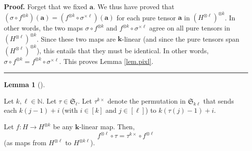 \documentclass[numbers=enddot,12pt,final,onecolumn,notitlepage]{scrartcl}%
\theoremstyle{definition}
\newtheorem{lem}[theo]{Lemma}
\newenvironment{lemma}[1][]
{\begin{lem}[#1]\begin{leftbar}}
{\end{leftbar}\end{lem}}
\newenvironment{proof}[1][Proof]{\noindent\textbf{#1.} }{\ \rule{0.5em}{0.5em}}
\begin{document}
\begin{proof}
Forget that we fixed $\mathbf{a}$. We thus have proved that $\left(
\sigma\circ f^{\otimes k}\right)  \left(  \mathbf{a}\right)  =\left(
f^{\otimes k}\circ\sigma^{\times\ell}\right)  \left(  \mathbf{a}\right)  $ for
each pure tensor $\mathbf{a}$ in $\left(  H^{\otimes\ell}\right)  ^{\otimes
k}$. In other words, the two maps $\sigma\circ f^{\otimes k}$ and $f^{\otimes
k}\circ\sigma^{\times\ell}$ agree on all pure tensors in $\left(
H^{\otimes\ell}\right)  ^{\otimes k}$. Since these two maps are $\mathbf{k}%
$-linear (and since the pure tensors span $\left(  H^{\otimes\ell}\right)
^{\otimes k}$), this entails that they must be identical. In other words,
$\sigma\circ f^{\otimes k}=f^{\otimes k}\circ\sigma^{\times\ell}$. This proves
Lemma \ref{lem.pixl}.
\end{proof}

\begin{lemma}
\label{lem.pikx}Let $k,\ell\in\mathbb{N}$. Let $\tau\in\mathfrak{S}_{\ell}$.
Let $\tau^{k\times}$ denote the permutation in $\mathfrak{S}_{k\ell}$ that
sends each $k\left(  j-1\right)  +i$ (with $i\in\left[  k\right]  $ and
$j\in\left[  \ell\right]  $) to $k\left(  \tau\left(  j\right)  -1\right)  +i$.

Let $f:H\rightarrow H^{\otimes k}$ be any $\mathbf{k}$-linear map. Then,%
\[
f^{\otimes\ell}\circ\tau=\tau^{k\times}\circ f^{\otimes\ell}%
\]
(as maps from $H^{\otimes\ell}$ to $H^{\otimes k\ell}$).
\end{lemma}
\end{document}
